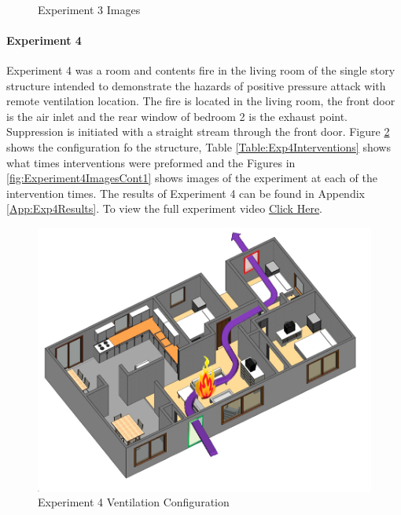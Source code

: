 \documentclass{article}
\begin{document}
\begin{figure}[H]
	\ContinuedFloat 
	\centering 
	 \ 
	\caption{Experiment 3 Images}
	\label{fig:Experiment3ImagesCont3} 
\end{figure}

\paragraph{Experiment 4}\mbox{}

Experiment 4 was a room and contents fire in the living room of the single story structure intended to demonstrate the hazards of positive pressure attack with remote ventilation location. The fire is located in the living room, the front door is the air inlet and the rear window of bedroom 2 is the exhaust point. Suppression is initiated with a straight stream through the front door. Figure \ref{fig:Exp4VentConfig} shows the configuration fo the structure, Table \ref{Table:Exp4Interventions} shows what times interventions were preformed and the Figures in \ref{fig:Experiment4ImagesCont1} shows images of the experiment at each of the intervention times. The results of Experiment 4 can be found in Appendix \ref{App:Exp4Results}. To view the full experiment video \href{https://youtu.be/RPpYMvXUp}{Click Here}.

\begin{figure}[H]
	\centering
	\includegraphics[width=5in]{0_Images/FireExperiments/Single_Story/Experiment_4.jpg}
	\caption{Experiment 4 Ventilation Configuration}
	\label{fig:Exp4VentConfig}
\end{figure}
\end{document}
